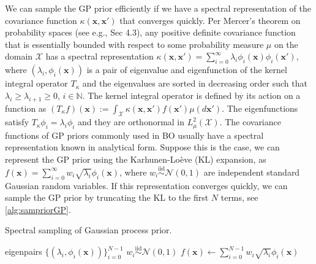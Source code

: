\documentclass{article}
\begin{document}
We can sample the GP prior efficiently if we have a spectral representation of the covariance function $\kappa(\mathbf{x}, \mathbf{x}')$ that converges quickly.
Per Mercer's theorem on probability spaces
(see e.g., \cite{Rasmussen2006} Sec 4.3), any positive definite covariance function that is essentially bounded with respect to some probability measure $\mu$ on the domain $\mathcal{X}$ has a spectral representation $\kappa(\mathbf{x}, \mathbf{x}') = \sum_{i=0}^\infty \lambda_i \phi_i(\mathbf{x}) \phi_i(\mathbf{x}')$,
where $(\lambda_i, \phi_i(\mathbf{x}))$ is a pair of eigenvalue and
eigenfunction of the kernel integral operator $T_\kappa$ and the
eigenvalues are sorted in decreasing order such that
$\lambda_i \ge \lambda_{i+1} \ge 0$, $i \in \mathbb{N}$. The kernel
integral operator is defined by its action on a function as
$(T_\kappa f)(\mathbf{x}) := \int_{\mathcal{X}} \kappa(\mathbf{x}, \mathbf{x}') f(\mathbf{x}') \mu(d \mathbf{x}')$.
The eigenfunctions satisfy $T_\kappa \phi_i = \lambda_i \phi_i$ and
they are orthonormal in $L^2_\mu(\mathcal{X})$. The covariance
functions of GP priors commonly used in BO usually
have a spectral representation known in analytical form.
Suppose this is the case, we can represent the GP prior using the  Karhunen-Loève (KL) expansion, as  $f(\mathbf{x}) = \sum_{i=0}^{\infty} w_i \sqrt{\lambda_i} \phi_i(\mathbf{x})$, where  $w_i \overset{\text{iid}}{\sim} \mathcal{N}(0,1)$ are independent standard Gaussian random variables.
If this representation converges quickly, we can sample the GP prior by truncating the KL to the first $N$ terms, see \cref{alg:sampriorGP}.

\begin{algorithm}[t]
	\caption{Spectral sampling of Gaussian process prior.}
	\label{alg:sampriorGP}
	\begin{algorithmic}[1] %
		\Input  eigenpairs
		$\{(\lambda_i, \phi_i(\mathbf{x}))\}_{i=0}^{N-1}$
		\State $w_i \overset{\text{iid}}{\sim} \mathcal{N}(0,1)$
		\State \Return $f(\mathbf{x}) \gets \sum_{i=0}^{N-1} w_i \sqrt{\lambda_i} \phi_i(\mathbf{x})$
	\end{algorithmic}
\end{algorithm}
\end{document}
